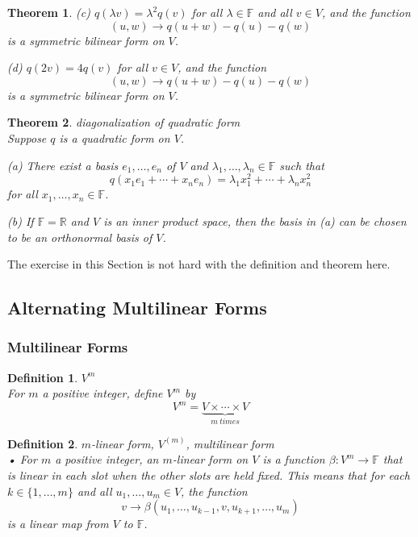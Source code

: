 \documentclass{article}
\newtheorem{theorem}{Theorem}[subsection]
\newtheorem{definition}{Definition}[subsection]
\newcommand{\RR}{\mathbb{R}}
\newcommand{\FF}{\mathbb{F}}
\begin{document}
\begin{CJK}{UTF8}{gkai}
\begin{theorem}
    (c) $q(\lambda v) = \lambda^2 q(v)$ for all $\lambda \in \FF$ and all $v \in V$, and the function
    \[(u, w) \to q(u+w)-q(u)-q(w)\]
    is a symmetric bilinear form on $V$.

    (d) $q(2v) = 4q(v)$ for all $v \in V$, and the function
    \[(u, w) \to q(u+w)-q(u)-q(w)\]
    is a symmetric bilinear form on $V$.
\end{theorem}   

\begin{theorem}
    diagonalization of quadratic form\\
    
    Suppose $q$ is a quadratic form on $V$.

    (a) There exist a basis $e_1,\ldots,e_n$ of $V$ and $\lambda_1,\ldots, \lambda_n \in \FF$ such that
    \[q(x_1e_1 + \cdots +x_ne_n) = \lambda_1x_1^2 +\cdots+ \lambda_n x_n^2\]
    for all $x_1,\ldots,x_n \in \FF$.

    (b) If $\FF = \RR$ and $V$ is an inner product space, then the basis in (a) can be chosen to be an orthonormal basis of $V$.
\end{theorem}

The exercise in this Section is not hard with the definition and theorem here.\\

\subsection{Alternating Multilinear Forms}

\subsubsection{Multilinear Forms}

\begin{definition}
    $V^m$\\
    For $m$ a positive integer, define $V^m$ by
    \[V^m =\underbrace{V\times \cdots\times V}_{m ~times}\]
\end{definition}

\begin{definition}
    $m$-linear form, $V^{(m)}$, multilinear form\\

    • For $m$ a positive integer, an $m$-linear form on $V$ is a function $\beta: V^m \to \FF$ that is linear in each slot when the other slots are held fixed. This means that for each $k \in \{1,\ldots,m\}$ and all $u_1,\ldots,u_m \in V$, the function 
    \[v \to\beta(u_1,\ldots,u_{k-1},v,u_{k+1},\ldots,u_m)\]
    is a linear map from $V$ to $\FF$.


\end{definition}
\end{CJK}
\end{document}
